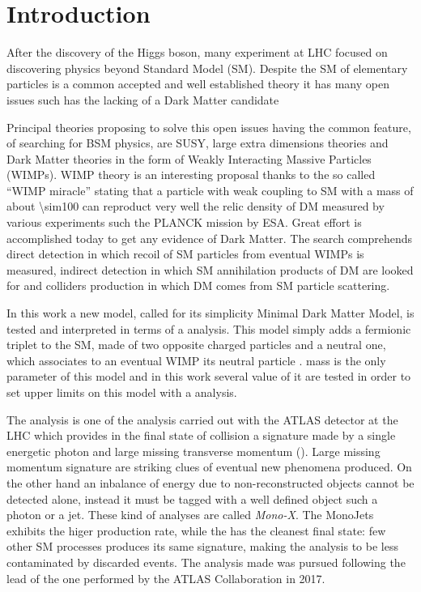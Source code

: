\chapter{Introduction}
\lettrine{A}{}fter the discovery of the Higgs boson, many experiment at LHC focused on discovering physics beyond Standard Model (SM). Despite the SM of elementary particles is a common accepted and well established theory it has many open issues such has the lacking of a Dark Matter candidate
  
Principal theories proposing to solve this open issues having the common feature, of searching for BSM physics, are SUSY, large extra dimensions theories and Dark Matter theories in the form of Weakly Interacting Massive Particles (WIMPs). WIMP theory is an interesting proposal thanks to the so called ``WIMP miracle'' stating that a particle with weak coupling to SM with a mass of about \SI{\sim100}{\gev} can reproduct very well the relic density of DM measured by various experiments such the PLANCK mission by ESA. Great effort is accomplished today to get any evidence of Dark Matter. The search comprehends direct detection in which recoil of SM particles from eventual WIMPs is measured, indirect detection in which SM annihilation products of DM are looked for and colliders production in which DM comes from SM particle scattering.

In this work a new model, called for its simplicity Minimal Dark Matter Model, is tested and interpreted in terms of a \mph analysis. This model simply adds a fermionic triplet to the SM, made of two opposite charged particles \chipm and a neutral one, which associates to an eventual WIMP its neutral particle \chizero. \chizero mass is the only parameter of this model and in this work several value of it are tested in order to set upper limits on this model with a \mph analysis.

The \mph analysis is one of the analysis carried out with the ATLAS detector at the LHC which provides in the final state of \pp collision a signature made by a single energetic photon and large missing transverse momentum (\met). Large missing momentum signature are striking clues of eventual new phenomena produced. On the other hand an inbalance of energy due to non-reconstructed objects cannot be detected alone, instead it must be tagged with a well defined object such a photon or a jet. These kind of analyses are called \emph{Mono-X}. The MonoJets exhibits the higer production rate, while the \mph has the cleanest final state: few other SM processes produces its same signature, making the \mph analysis to be less contaminated by discarded events. The analysis made was pursued following the lead of the one performed by the ATLAS Collaboration in 2017.

